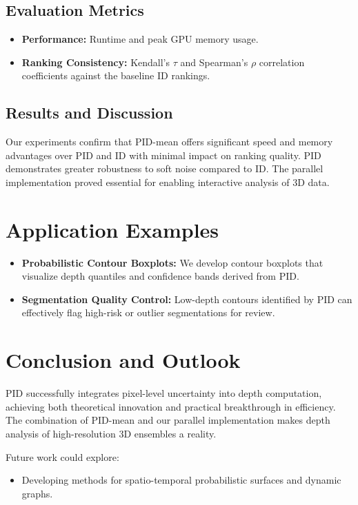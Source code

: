 \documentclass[review,journal]{vgtc}              %
\begin{document}
\subsection{Evaluation Metrics}
\begin{itemize}
    \item \textbf{Performance:} Runtime and peak GPU memory usage.
    \item \textbf{Ranking Consistency:} Kendall's $\tau$ and Spearman's $\rho$ correlation coefficients against the baseline ID rankings.
    
\end{itemize}

\subsection{Results and Discussion}
Our experiments confirm that PID-mean offers significant speed and memory advantages over PID and ID with minimal impact on ranking quality. PID demonstrates greater robustness to soft noise compared to ID. The parallel implementation proved essential for enabling interactive analysis of 3D data.

\section{Application Examples}
\begin{itemize}
    \item \textbf{Probabilistic Contour Boxplots:} We develop contour boxplots that visualize depth quantiles and confidence bands derived from PID.
    \item \textbf{Segmentation Quality Control:} Low-depth contours identified by PID can effectively flag high-risk or outlier segmentations for review.
   
\end{itemize}

\section{Conclusion and Outlook}
PID successfully integrates pixel-level uncertainty into depth computation, achieving both theoretical innovation and practical breakthrough in efficiency. The combination of PID-mean and our parallel implementation makes depth analysis of high-resolution 3D ensembles a reality.

Future work could explore:
\begin{itemize}
    \item Developing methods for spatio-temporal probabilistic surfaces and dynamic graphs.
\end{itemize}
\end{document}
